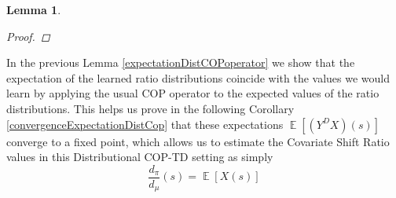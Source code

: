 \documentclass[12pt,a4paper,openright,twoside]{article}
\DeclareMathOperator*{\E}{\mathbb{E}}
\numberwithin{equation}{section}
\newtheorem{lemma}[theorem]{Lemma}
\theoremstyle{definition}
\theoremstyle{remark}
\theoremstyle{plain}
\begin{document}
\begin{lemma}
\begin{proof}

\end{proof}
\end{lemma}

In the previous Lemma \ref{expectationDistCOPoperator} we show that the expectation of the learned ratio distributions coincide with the values we would learn by applying the usual COP operator to the expected values of the ratio distributions. This helps us prove in the following Corollary \ref{convergenceExpectationDistCop} that these expectations $\E[(Y^DX)(s)]$ converge to a fixed point, which allows us to estimate the Covariate Shift Ratio values in this Distributional COP-TD setting as simply
\begin{equation*}
	\frac{d_\pi}{d_\mu}(s) = \E [X(s)]
\end{equation*}
\end{document}
